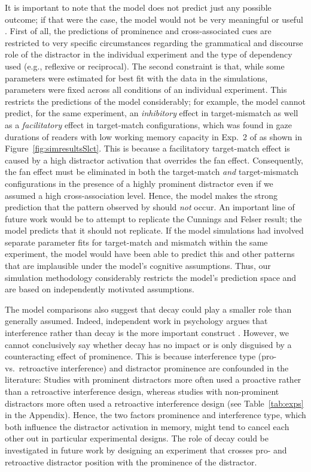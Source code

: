 \documentclass{cambridge7A}\usepackage[]{graphicx}\usepackage[]{color}
\begin{document}
It is important to note that the model does not predict just any possible outcome; if that were the case, the model would not be very meaningful or useful \citep{rp}.
First of all, the predictions of prominence and cross-associated cues are restricted to very specific circumstances regarding the grammatical and discourse role of the distractor in the individual experiment and the type of dependency used (e.g., reflexive or reciprocal).
The second constraint is that, while some parameters were estimated for best fit with the data in the simulations, parameters were fixed across all conditions of an individual experiment.
This restricts the predictions of the model considerably; for example, the model cannot predict, for the same experiment, an  \emph{inhibitory} effect in target-mismatch as well as a  \emph{facilitatory} effect in target-match configurations, which was found in gaze durations of readers with low working memory capacity in Exp.~2 of \cite{CunningsFelser2013} as shown in Figure~\ref{fig:simresultsSlct}. 
This is because a facilitatory target-match effect is caused by a high  distractor activation that overrides the  fan effect. Consequently, the fan effect must be eliminated in both the target-match \textit{and} target-mismatch configurations in the presence of a highly prominent distractor even if we assumed a high cross-association level.
Hence, the model makes the strong prediction that the pattern observed by \cite{CunningsFelser2013} should \emph{not} occur. An important line of future work would be to attempt to replicate the Cunnings and Felser result; the model predicts that it should not replicate. If the model simulations had involved separate parameter fits for target-match and mismatch within the same experiment, the model would have been able to predict this and other patterns that are implausible under the model's cognitive assumptions. Thus, our simulation methodology  considerably restricts the model's prediction space and are based on independently motivated assumptions.

The model comparisons also suggest that  decay could play a smaller role than generally assumed. Indeed, independent work in psychology argues that interference rather than decay is the more important construct  \citep{OberauerLewandowsky2014,OberauerLewandowsky2013,berman2009search}. 
However, we cannot conclusively say whether decay has no impact or is only disguised by a counteracting effect of prominence. This is because interference type (pro- vs.\ retroactive interference) and distractor prominence are confounded in the literature:
Studies with prominent distractors more often used a proactive rather than a retroactive interference design, whereas studies with non-prominent distractors more often used a retroactive interference design (see Table~\ref{tab:exps} in the Appendix).
Hence, the two factors prominence and interference type, which both influence the distractor activation in memory, might tend to cancel each other out in particular experimental designs. 
The role of decay could be investigated in future work by designing an experiment that crosses pro- and retroactive distractor position with the prominence of the distractor.
\end{document}
